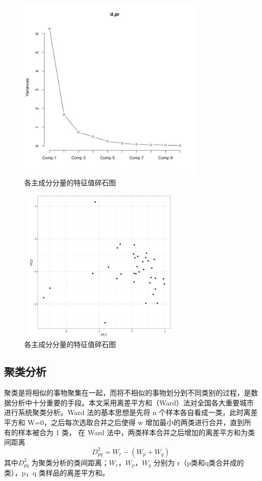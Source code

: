 \documentclass [a4paper]{article}
\begin{document}
\begin{figure}[h!]
  \centering

         \includegraphics[width=9cm]{img/stone.png}
      \caption{各主成分分量的特征值碎石图}
\end{figure}

\begin{figure}[h!]
  \centering

         \includegraphics[width=8cm,height=7.5cm]{img/pc.png}
      \caption{各主成分分量的特征值碎石图}
\end{figure}

\subsection{聚类分析}
聚类是将相似的事物聚集在一起，而将不相似的事物划分到不同类别的过程，是数据分析中十分重要的手段。本文采用离差平方和（Ward）法对全国各大重要城市进行系统聚类分析。Ward 法的基本思想是先将 n 个样本各自看成一类，此时离差平方和 W=0，之后每次选取合并之后使得 w 增加最小的两类进行合并，直到所有的样本被合为 1 类， 在 Ward 法中，两类样本合并之后增加的离差平方和为类间距离
$$D_{pq}^2 = W_{r} - (W_p + W_q)$$
其中$D_{pq}^2$ 为聚类分析的类间距离；$W_r$，$W_p$，$W_q$
分别为 r（p类和q类合并成的类），p，q 类样品的离差平方和。
\end{document}
